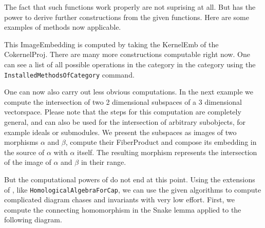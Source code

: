 \begin{small}

\end{small}

The fact that such functions work properly are not suprising at all. But \CapPkg has the power to derive
further constructions from the given functions. Here are some examples of methods now applicable.

\begin{small}

\end{small}

This \textrm{ImageEmbedding} is computed by taking the \textrm{KernelEmb} of the \textrm{CokernelProj}.
There are many more constructions computable right now. One can see a list of all possible operations in the category
in the category using the \texttt{InstalledMethodsOfCategory} command.

\begin{small}

\end{small}

One can now also carry out less obvious computations. In the next example we compute the intersection of two 2 dimensional
subspaces of a 3 dimensional vectorspace. Please note that the steps for this computation are completely general, and
can also be used for the intersection of arbitrary subobjects, for example ideals or submodules. We present the
subspaces as images of two morphisms $\alpha$ and $\beta$, compute their \textrm{FiberProduct} and compose its embedding
in the source of $\alpha$ with $\alpha$ itself. The resulting morphism represents the intersection of the image of $\alpha$
and $\beta$ in their range.

\begin{small}
 
\end{small}

But the computational powers of \CapPkg do not end at this point. Using the extensions of \CapPkg, like \texttt{HomologicalAlgebraForCap},
we can use the given algorithms to compute complicated diagram chases and invariants with very low effort. First,
we compute the connecting homomorphism in the Snake lemma applied to the following diagram.

